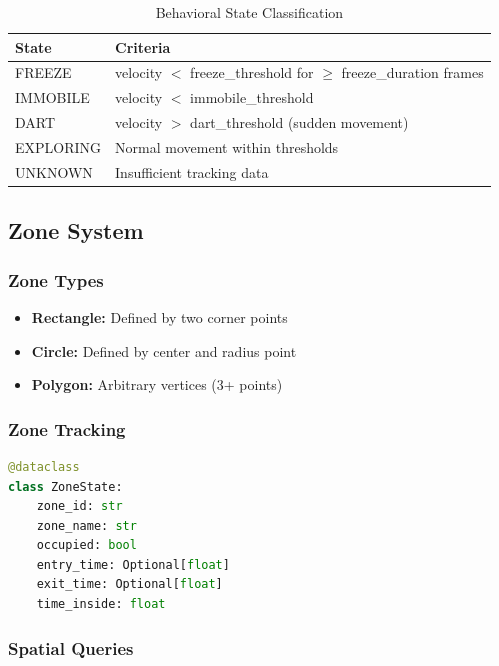 \documentclass[11pt,a4paper]{article}
\begin{document}
\begin{table}[H]
\centering
\begin{tabular}{@{}lp{8cm}@{}}
\toprule
\textbf{State} & \textbf{Criteria} \\
\midrule
FREEZE & velocity $<$ freeze\_threshold for $\geq$ freeze\_duration frames \\
IMMOBILE & velocity $<$ immobile\_threshold \\
DART & velocity $>$ dart\_threshold (sudden movement) \\
EXPLORING & Normal movement within thresholds \\
UNKNOWN & Insufficient tracking data \\
\bottomrule
\end{tabular}
\caption{Behavioral State Classification}
\end{table}

\subsection{Zone System}

\subsubsection{Zone Types}

\begin{itemize}    \item \textbf{Rectangle:} Defined by two corner points
    \item \textbf{Circle:} Defined by center and radius point
    \item \textbf{Polygon:} Arbitrary vertices (3+ points)
\end{itemize}

\subsubsection{Zone Tracking}

\begin{lstlisting}[language=Python]
@dataclass
class ZoneState:
    zone_id: str
    zone_name: str
    occupied: bool
    entry_time: Optional[float]
    exit_time: Optional[float]
    time_inside: float
\end{lstlisting}

\subsubsection{Spatial Queries}
\end{document}
